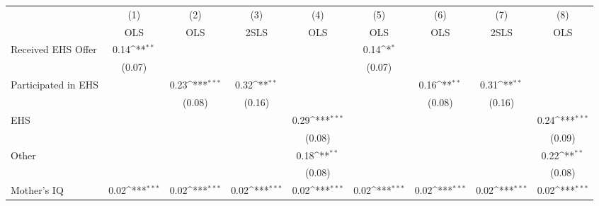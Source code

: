 {
\def\sym#1{\ifmmode^{#1}\else\(^{#1}\)\fi}
\begin{tabular}{l*{8}{c}}
\hline\hline
                    &\multicolumn{1}{c}{(1)}&\multicolumn{1}{c}{(2)}&\multicolumn{1}{c}{(3)}&\multicolumn{1}{c}{(4)}&\multicolumn{1}{c}{(5)}&\multicolumn{1}{c}{(6)}&\multicolumn{1}{c}{(7)}&\multicolumn{1}{c}{(8)}\\
                    &\multicolumn{1}{c}{OLS}&\multicolumn{1}{c}{OLS}&\multicolumn{1}{c}{2SLS}&\multicolumn{1}{c}{OLS}&\multicolumn{1}{c}{OLS}&\multicolumn{1}{c}{OLS}&\multicolumn{1}{c}{2SLS}&\multicolumn{1}{c}{OLS}\\
\hline
Received EHS Offer  &        0.14\sym{**} &                     &                     &                     &        0.14\sym{*}  &                     &                     &                     \\
                    &      (0.07)         &                     &                     &                     &      (0.07)         &                     &                     &                     \\
[1em]
Participated in EHS &                     &        0.23\sym{***}&        0.32\sym{**} &                     &                     &        0.16\sym{**} &        0.31\sym{**} &                     \\
                    &                     &      (0.08)         &      (0.16)         &                     &                     &      (0.08)         &      (0.16)         &                     \\
[1em]
EHS                 &                     &                     &                     &        0.29\sym{***}&                     &                     &                     &        0.24\sym{***}\\
                    &                     &                     &                     &      (0.08)         &                     &                     &                     &      (0.09)         \\
[1em]
Other               &                     &                     &                     &        0.18\sym{**} &                     &                     &                     &        0.22\sym{**} \\
                    &                     &                     &                     &      (0.08)         &                     &                     &                     &      (0.08)         \\
[1em]
Mother's IQ         &        0.02\sym{***}&        0.02\sym{***}&        0.02\sym{***}&        0.02\sym{***}&        0.02\sym{***}&        0.02\sym{***}&        0.02\sym{***}&        0.02\sym{***}\\

\end{tabular}}

